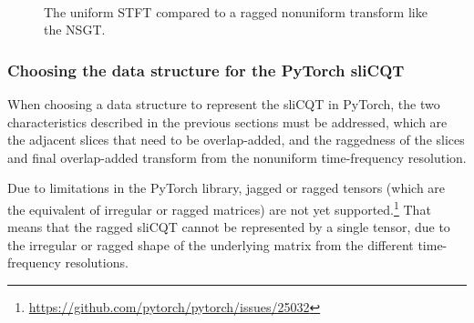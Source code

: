 \documentclass[report.tex]{subfiles}
\begin{document}
\begin{figure}[ht]
	\centering
	\\
	\caption{The uniform STFT compared to a ragged nonuniform transform like the NSGT.}
	\label{fig:contraststftslicqt}
\end{figure}

\subsubsection{Choosing the data structure for the PyTorch sliCQT}
\label{sec:torchslicqdatastructure}

When choosing a data structure to represent the sliCQT in PyTorch, the two characteristics described in the previous sections must be addressed, which are the adjacent slices that need to be overlap-added, and the raggedness of the slices and final overlap-added transform from the nonuniform time-frequency resolution.

Due to limitations in the PyTorch library, jagged or ragged tensors (which are the equivalent of irregular or ragged matrices) are not yet supported.\footnote{\url{https://github.com/pytorch/pytorch/issues/25032}} That means that the ragged sliCQT cannot be represented by a single tensor, due to the irregular or ragged shape of the underlying matrix from the different time-frequency resolutions.
\end{document}
